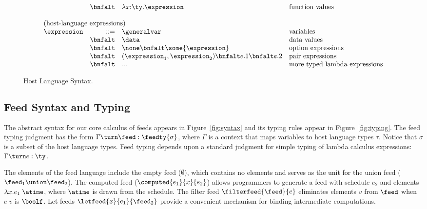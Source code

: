 \begin{figure}[t]
\[\begin{array}{lrll}
& \bnfalt & \lambda x{:}\ty.\expression & \mbox{function values} \\
\\
\multicolumn{4}{l}{\mbox{(host-language expressions)}}\\ 
\expression & ::= & \generalvar & \mbox{variables} \\
 & \bnfalt & \data & \mbox{data values} \\
 & \bnfalt & \none \bnfalt 
              \some{\expression} & \mbox{option expressions}\\
 & \bnfalt & (\expression_1,\expression_2) \bnfalt e.1 \bnfalt e.2 
    & \mbox{pair expressions} \\
 & \bnfalt & ... & \mbox{more typed lambda expressions} \\
\end{array}
\]
\caption{Host Language Syntax.}
\label{fig:host-language}
\end{figure}


\subsection{Feed Syntax and Typing}

The abstract syntax for our core calculus of feeds appears in
Figure~\ref{fig:syntax} and its typing rules appear in 
Figure~\ref{fig:typing}.  The feed typing judgment has the form
$\Gamma \turn \feed : \feedty{\sigma}$, where $\Gamma$ is a context that maps
variables to host language types $\tau$.  Notice that $\sigma$ is a subset of the
host language types.  Feed typing depends upon a standard judgment for
simple typing of lambda calculus expressions:  $\Gamma \turn e : \ty$.

The elements of the feed language include
the empty feed ($\emptyset$), which contains no elements and serves as
the unit for the union feed ($\feed_1 \union \feed_2$).  The
computed feed ($\computed{e_1}{x}{e_2}$) allows programmers to
generate a feed with schedule $e_2$ and elements $\lambda x.e_1\; \atime$,
where $\atime$ is drawn from the schedule. The filter feed
$\filterfeed{\feed}{e}$ eliminates elements $v$ from $\feed$ when
$e\; v$ is $\boolf$.  Let feeds $\letfeed{x}{e_1}{\feed_2}$
provide a convenient mechanism for binding intermediate computations.

